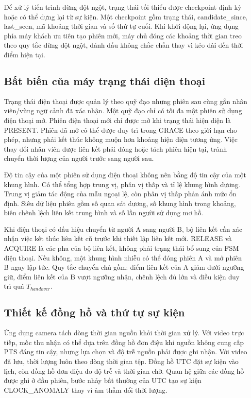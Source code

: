 Để xử lý tiến trình dừng đột ngột, trạng thái tối thiểu được checkpoint định kỳ hoặc có thể dựng lại từ sự kiện. Một checkpoint gồm trạng thái, candidate\_since, last\_seen, mã khoảng thời gian và số thứ tự cuối. Khi khởi động lại, ứng dụng phía máy khách ưu tiên tạo phiên mới, máy chủ đóng các khoảng thời gian treo theo quy tắc dừng đột ngột, đánh dấu không chắc chắn thay vì kéo dài đến thời điểm hiện tại.

\subsection{Bất biến của máy trạng thái điện thoại}
Trạng thái điện thoại được quản lý theo quỹ đạo nhưng phiên sau cùng gắn nhân viên/vùng ngữ cảnh đã xác nhận. Một quỹ đạo chỉ có tối đa một phiên sử dụng điện thoại mở. Phiên điện thoại mới chỉ được mở khi trạng thái hiện diện là PRESENT. Phiên đã mở có thể được duy trì trong GRACE theo giới hạn cho phép, nhưng phải kết thúc không muộn hơn khoảng hiện diện tương ứng. Việc thay đổi nhân viên được liên kết phải đóng hoặc tách phiên hiện tại, tránh chuyển thời lượng của người trước sang người sau.

Độ tin cậy của một phiên sử dụng điện thoại không nên bằng độ tin cậy của một khung hình. Có thể tổng hợp trung vị, phân vị thấp và tỉ lệ khung hình dương. Trung vị giảm tác động của mẫu ngoại lệ, còn phân vị thấp phản ánh mức ổn định. Siêu dữ liệu phiên gồm số quan sát dương, số khung hình trong khoảng, biên chênh lệch liên kết trung bình và số lần người sử dụng mơ hồ.

Khi điện thoại có dấu hiệu chuyển từ người A sang người B, bộ liên kết cần xác nhận việc kết thúc liên kết cũ trước khi thiết lập liên kết mới. RELEASE và ACQUIRE là các pha của bộ liên kết, không phải trạng thái bổ sung của FSM điện thoại. Nếu không, một khung hình nhiễu có thể đóng phiên A và mở phiên B ngay lập tức. Quy tắc chuyển chủ gồm: điểm liên kết của A giảm dưới ngưỡng giữ, điểm liên kết của B vượt ngưỡng nhận, chênh lệch đủ lớn và điều kiện duy trì quá $T_{handover}$.

\subsection{Thiết kế đồng hồ và thứ tự sự kiện}
Ứng dụng camera tách dòng thời gian nguồn khỏi thời gian xử lý. Với video trực tiếp, mốc thu nhận có thể dựa trên đồng hồ đơn điệu khi nguồn không cung cấp PTS đáng tin cậy, nhưng lựa chọn và độ trễ nguồn phải được ghi nhận. Với video đã lưu, thời lượng luôn theo dòng thời gian tệp. Đồng hồ UTC đặt sự kiện vào lịch, còn đồng hồ đơn điệu đo độ trễ và thời gian chờ. Quan hệ giữa các đồng hồ được ghi ở đầu phiên, bước nhảy bất thường của UTC tạo sự kiện CLOCK\_ANOMALY thay vì âm thầm đổi thời lượng.

